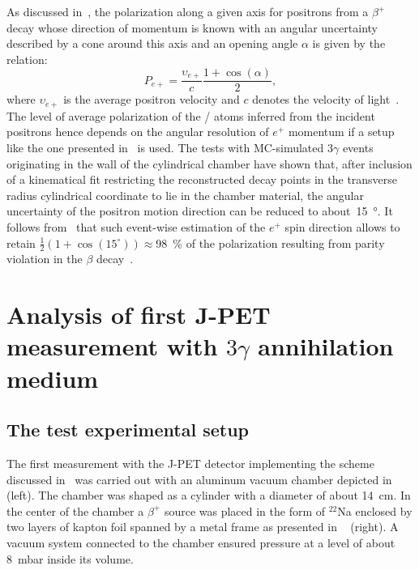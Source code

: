 As discussed in~, the polarization along a given axis for positrons from a $\beta^+$ decay whose direction of momentum is known with an angular uncertainty described by a cone around this axis and an opening angle $\alpha$ is given by the relation:
\begin{equation}
  \label{eq:jpet_positron_polarization}
  P_{e+} = \frac{\upsilon_{e+}}{c}\frac{1+\cos(\alpha)}{2},
\end{equation}
where $\upsilon_{e+}$ is the average positron velocity and $c$ denotes the velocity of light~\cite{Coleman}. The level of average polarization of the \ops/ atoms inferred from the incident positrons hence depends on the angular resolution of $e^+$ momentum if a setup like the one presented in~ is used. The tests with MC-simulated $3\gamma$ events originating in the wall of the cylindrical chamber have shown that, after inclusion of a kinematical fit restricting the reconstructed decay points in the transverse radius cylindrical coordinate to lie in the chamber material, the angular uncertainty of the positron motion direction can be reduced to about~\SI{15}{\degree}. It follows from~ that
such event-wise estimation of the $e^+$ spin direction
allows to retain $\frac{1}{2}(1+\cos(15^{\circ}))\approx$\SI{98}{\percent} of the polarization resulting from parity violation in the $\beta$ decay~\cite{gajos_gps}.

\section{Analysis of first J-PET measurement with $3 \gamma$ annihilation medium}\label{sec:jpet_firs_data}

\subsection{The test experimental setup}
\label{sec:jpet_test_setup}
The first measurement with the J-PET detector implementing the scheme discussed in~ was carried out with an aluminum vacuum chamber depicted in~ (left). The chamber was shaped as a cylinder with a diameter of about 14~cm. In the center of the chamber a $\beta^+$ source was placed in the form of $^{22}$Na enclosed by two layers of kapton foil spanned by a metal frame as presented in ~ (right). A vacuum system connected to the chamber ensured pressure at a level of about 8~mbar inside its volume.

